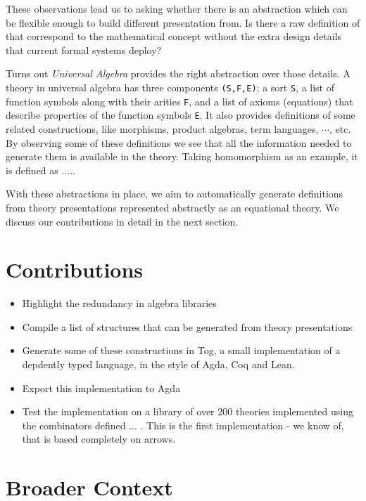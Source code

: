 These observations lead us to asking whether there is an abstraction which can be flexible enough to build different presentation from. Is there a raw definition of \monoid that correspond to the mathematical concept without the extra design details that current formal systems deploy? 

Turns out \emph{Universal Algebra} provides the right abstraction over those details. A theory in universal algebra has three components \verb|(S,F,E)|; a sort \verb|S|, a list of function symbols along with their arities \verb|F|, and a list of axioms (equations) that describe properties of the function symbols \verb|E|. It also provides definitions of some related constructions, like morphisms, product algebras, term languages, $\cdots$, etc. By observing some of these definitions we see that all the information needed to generate them is available in the theory. Taking homomorphism as an example, it is defined as ..... 

With these abstractions in place, we aim to automatically generate definitions from theory presentations represented abstractly as an equational theory. We discuss our contributions in detail in the next section. 

\section{Contributions}
\begin{itemize}
    \item Highlight the redundancy in algebra libraries 
    \item Compile a list of structures that can be generated from theory presentations
    \item Generate some of these constructions in Tog, a small implementation of a depdently typed language, in the style of Agda, Coq and Lean. 
    \item Export this implementation to Agda 
    \item Test the implementation on a library of over $200$ theories implemented using the combinators defined ... . This is the first implementation - we know of, that is based completely on arrows. 
\end{itemize}  

\section{Broader Context}
\label{sec:broader_context}

